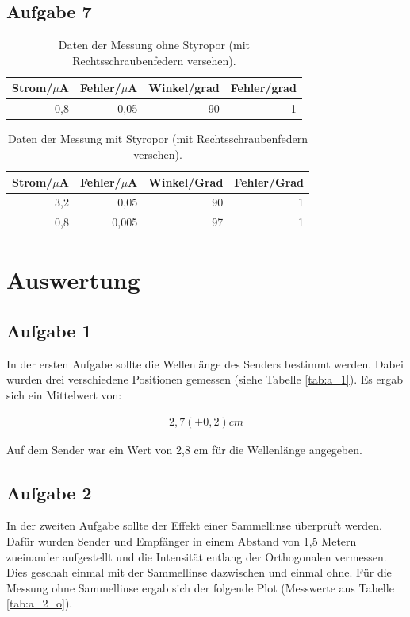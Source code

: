\documentclass[12pt]{scrartcl}
\begin{document}
\subsection{Aufgabe 7}

\begin{table}[H]
\caption{Daten der Messung ohne Styropor (mit Rechtsschraubenfedern versehen).}
\centering
\begin{tabular}{|l|l|l|l|}
\hline
Strom/$\mu$A & Fehler/$\mu$A & Winkel/grad & Fehler/grad \\ \hline
\multicolumn{1}{|r|}{0,8} & \multicolumn{1}{r|}{0,05} & \multicolumn{1}{r|}{90} & \multicolumn{1}{r|}{1} \\ \hline
\end{tabular}
\label{tab:a_7_o}
\end{table}

\begin{table}[H]
\caption{Daten der Messung mit Styropor (mit Rechtsschraubenfedern versehen).}
\centering
\begin{tabular}{|r|r|r|r|}
\hline
\multicolumn{1}{|l|}{Strom/$\mu$A} & \multicolumn{1}{c|}{Fehler/$\mu$A} & \multicolumn{1}{l|}{Winkel/Grad} & \multicolumn{1}{l|}{Fehler/Grad} \\ \hline
3,2 & 0,05 & 90 & 1 \\ \hline
0,8 & 0,005 & 97 & 1 \\ \hline
\end{tabular}
\label{tab:a_7_m}
\end{table}





\section{Auswertung}
\subsection{Aufgabe 1}
In der ersten Aufgabe sollte die Wellenlänge des Senders bestimmt werden. Dabei wurden drei verschiedene Positionen gemessen (siehe Tabelle \ref{tab:a_1}). Es ergab sich ein Mittelwert von:

\begin{align*}
2,7 (\pm 0,2) cm
\end{align*}

Auf dem Sender war ein Wert von 2,8 cm für die Wellenlänge angegeben.

\subsection{Aufgabe 2}
In der zweiten Aufgabe sollte der Effekt einer Sammellinse überprüft werden.
Dafür wurden Sender und Empfänger in einem Abstand von 1,5 Metern zueinander aufgestellt und die Intensität entlang der Orthogonalen vermessen. Dies geschah einmal mit der Sammellinse dazwischen und einmal ohne. Für die Messung ohne Sammellinse ergab sich der folgende Plot (Messwerte aus Tabelle \ref{tab:a_2_o}).
\end{document}

